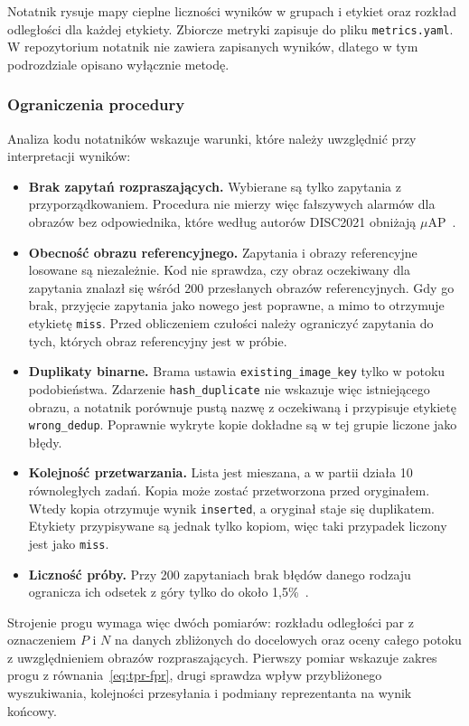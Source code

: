 Notatnik rysuje mapy cieplne liczności wyników w grupach i etykiet
oraz rozkład odległości dla każdej etykiety. Zbiorcze metryki
zapisuje do pliku \texttt{metrics.yaml}. W repozytorium notatnik
nie zawiera zapisanych wyników, dlatego w tym podrozdziale opisano
wyłącznie metodę.

\subsubsection{Ograniczenia procedury}

Analiza kodu notatników wskazuje warunki, które należy uwzględnić
przy interpretacji wyników:

\begin{itemize}
    \item \textbf{Brak zapytań rozpraszających.} Wybierane są tylko
    zapytania z przyporządkowaniem. Procedura nie mierzy więc
    fałszywych alarmów dla obrazów bez odpowiednika, które według
    autorów DISC2021 obniżają \(\mu\mathrm{AP}\)~\cite{douze2021disc}.
    \item \textbf{Obecność obrazu referencyjnego.} Zapytania i obrazy
    referencyjne losowane są niezależnie. Kod nie sprawdza, czy obraz
    oczekiwany dla zapytania znalazł się wśród 200 przesłanych obrazów
    referencyjnych. Gdy go brak, przyjęcie zapytania jako nowego jest
    poprawne, a mimo to otrzymuje etykietę \texttt{miss}. Przed
    obliczeniem czułości należy ograniczyć zapytania do tych, których
    obraz referencyjny jest w próbie.
    \item \textbf{Duplikaty binarne.} Brama ustawia
    \texttt{existing\_image\_key} tylko w potoku podobieństwa.
    Zdarzenie \texttt{hash\_duplicate} nie wskazuje więc istniejącego
    obrazu, a notatnik porównuje pustą nazwę z oczekiwaną i przypisuje
    etykietę \texttt{wrong\_dedup}. Poprawnie wykryte kopie dokładne
    są w tej grupie liczone jako błędy.
    \item \textbf{Kolejność przetwarzania.} Lista jest mieszana,
    a w partii działa 10 równoległych zadań. Kopia może zostać
    przetworzona przed oryginałem. Wtedy kopia otrzymuje wynik
    \texttt{inserted}, a oryginał staje się duplikatem. Etykiety
    przypisywane są jednak tylko kopiom, więc taki przypadek liczony
    jest jako \texttt{miss}.
    \item \textbf{Liczność próby.} Przy 200 zapytaniach brak błędów
    danego rodzaju ogranicza ich odsetek z góry tylko do około
    1,5\%~\cite{hanley1983rule}.
\end{itemize}

Strojenie progu wymaga więc dwóch pomiarów: rozkładu odległości par
z oznaczeniem \(P\) i \(N\) na danych zbliżonych do docelowych oraz
oceny całego potoku z uwzględnieniem obrazów rozpraszających.
Pierwszy pomiar wskazuje zakres progu z równania~\eqref{eq:tpr-fpr},
drugi sprawdza wpływ przybliżonego wyszukiwania, kolejności przesyłania
i podmiany reprezentanta na wynik końcowy.
